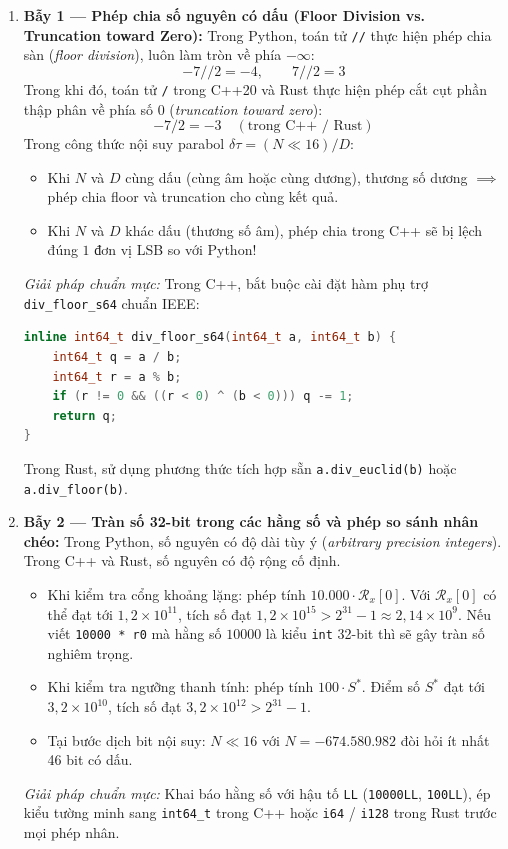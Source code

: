 \documentclass[11pt,a4paper]{article}
\begin{document}
\begin{enumerate}
    \setlength{\itemsep}{2pt}
    \item \textbf{Bẫy 1 --- Phép chia số nguyên có dấu (Floor Division vs. Truncation toward Zero):}
    Trong Python, toán tử \texttt{//} thực hiện phép chia sàn (\emph{floor division}), luôn làm tròn về phía $-\infty$:
    \[
    -7 // 2 = -4, \qquad 7 // 2 = 3
    \]
    Trong khi đó, toán tử \texttt{/} trong C++20 và Rust thực hiện phép cắt cụt phần thập phân về phía số 0 (\emph{truncation toward zero}):
    \[
    -7 / 2 = -3 \quad (\text{trong C++ / Rust})
    \]
    Trong công thức nội suy parabol $\delta\tau = (N \ll 16) / D$:
    \begin{itemize}
        \item Khi $N$ và $D$ cùng dấu (cùng âm hoặc cùng dương), thương số dương $\implies$ phép chia floor và truncation cho cùng kết quả.
        \item Khi $N$ và $D$ khác dấu (thương số âm), phép chia trong C++ sẽ bị lệch đúng $1\text{ đơn vị}$ LSB so với Python!
    \end{itemize}
    \textit{Giải pháp chuẩn mực:} Trong C++, bắt buộc cài đặt hàm phụ trợ \texttt{div\_floor\_s64} chuẩn IEEE:
\begin{lstlisting}[language=C++]
inline int64_t div_floor_s64(int64_t a, int64_t b) {
    int64_t q = a / b;
    int64_t r = a % b;
    if (r != 0 && ((r < 0) ^ (b < 0))) q -= 1;
    return q;
}
\end{lstlisting}
    Trong Rust, sử dụng phương thức tích hợp sẵn \texttt{a.div\_euclid(b)} hoặc \texttt{a.div\_floor(b)}.

    \item \textbf{Bẫy 2 --- Tràn số 32-bit trong các hằng số và phép so sánh nhân chéo:}
    Trong Python, số nguyên có độ dài tùy ý (\emph{arbitrary precision integers}). Trong C++ và Rust, số nguyên có độ rộng cố định.
    \begin{itemize}
        \item Khi kiểm tra cổng khoảng lặng: phép tính $10.000 \cdot \mathcal{R}_x[0]$. Với $\mathcal{R}_x[0]$ có thể đạt tới $1{,}2 \times 10^{11}$, tích số đạt $1{,}2 \times 10^{15} > 2^{31} - 1 \approx 2{,}14 \times 10^9$. Nếu viết \texttt{10000 * r0} mà hằng số $10000$ là kiểu \texttt{int} 32-bit thì sẽ gây tràn số nghiêm trọng.
        \item Khi kiểm tra ngưỡng thanh tính: phép tính $100 \cdot S^*$. Điểm số $S^*$ đạt tới $3{,}2 \times 10^{10}$, tích số đạt $3{,}2 \times 10^{12} > 2^{31} - 1$.
        \item Tại bước dịch bit nội suy: $N \ll 16$ với $N = -674.580.982$ đòi hỏi ít nhất 46 bit có dấu.
    \end{itemize}
    \textit{Giải pháp chuẩn mực:} Khai báo hằng số với hậu tố \texttt{LL} (\texttt{10000LL}, \texttt{100LL}), ép kiểu tường minh sang \texttt{int64\_t} trong C++ hoặc \texttt{i64} / \texttt{i128} trong Rust trước mọi phép nhân.


\end{enumerate}
\end{document}
